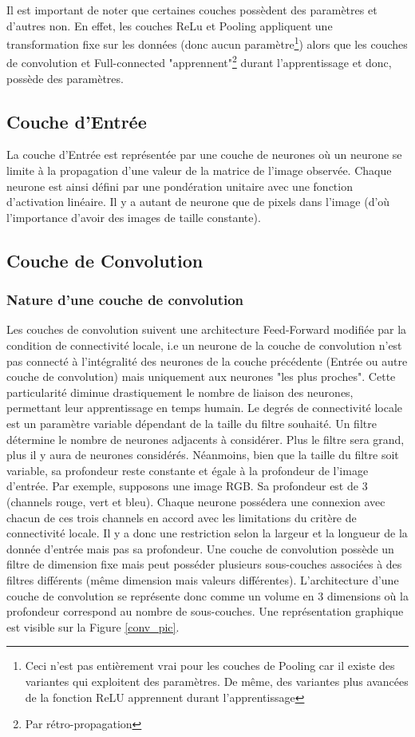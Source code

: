 \noindent Il est important de noter que certaines couches possèdent des paramètres et d'autres non. En effet, les couches ReLu et Pooling appliquent une transformation fixe sur les données (donc aucun paramètre\footnote{Ceci n'est pas entièrement vrai pour les couches de Pooling car il existe des variantes qui exploitent des paramètres. De même, des variantes plus avancées de la fonction ReLU apprennent durant l'apprentissage}) alors que les couches de convolution et Full-connected "apprennent"\footnote{Par rétro-propagation} durant l'apprentissage et donc, possède des paramètres.

\subsection{Couche d'Entrée}
La couche d'Entrée est représentée par une couche de neurones où un neurone se limite à la propagation d'une valeur de la matrice de l'image observée. Chaque neurone est ainsi défini par une pondération unitaire avec une fonction d'activation linéaire. Il y a autant de neurone que de pixels dans l'image (d'où l'importance d'avoir des images de taille constante).\\

\subsection{Couche de Convolution}

\subsubsection{Nature d'une couche de convolution}

Les couches de convolution suivent une architecture Feed-Forward modifiée par la condition de connectivité locale, i.e un neurone de la couche de convolution n'est pas connecté à l'intégralité des neurones de la couche précédente (Entrée ou autre couche de convolution) mais uniquement aux neurones "les plus proches". Cette particularité diminue drastiquement le nombre de liaison des neurones, permettant leur apprentissage en temps humain. Le degrés de connectivité locale est un paramètre variable dépendant de la taille du filtre souhaité. Un filtre détermine le nombre de neurones adjacents à considérer. Plus le filtre sera grand, plus il y aura de neurones considérés. Néanmoins, bien que la taille du filtre soit variable, sa profondeur reste constante et égale à la profondeur de l'image d'entrée. Par exemple, supposons une image RGB. Sa profondeur est de 3 (channels rouge, vert et bleu). Chaque neurone possédera une connexion avec chacun de ces trois channels en accord avec les limitations du critère de connectivité locale. Il y a donc une restriction selon la largeur et la longueur de la donnée d'entrée mais pas sa profondeur. Une couche de convolution possède un filtre de dimension fixe mais peut posséder plusieurs sous-couches associées à des filtres différents (même dimension mais valeurs différentes). L'architecture d'une couche de convolution se représente donc comme un volume en 3 dimensions où la profondeur correspond au nombre de sous-couches. Une représentation graphique est visible sur la Figure \ref{conv_pic}.\\

